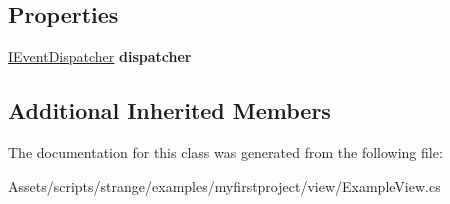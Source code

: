 \subsection*{Properties}
\begin{DoxyCompactItemize}
\item 
\hypertarget{classstrange_1_1examples_1_1myfirstproject_1_1_example_view_a92507b17eea31ee95bbf85e658c4029c}{\hyperlink{interfacestrange_1_1extensions_1_1dispatcher_1_1eventdispatcher_1_1api_1_1_i_event_dispatcher}{I\-Event\-Dispatcher} {\bfseries dispatcher}}\label{classstrange_1_1examples_1_1myfirstproject_1_1_example_view_a92507b17eea31ee95bbf85e658c4029c}

\end{DoxyCompactItemize}
\subsection*{Additional Inherited Members}


The documentation for this class was generated from the following file\-:\begin{DoxyCompactItemize}
\item 
Assets/scripts/strange/examples/myfirstproject/view/Example\-View.\-cs\end{DoxyCompactItemize}
